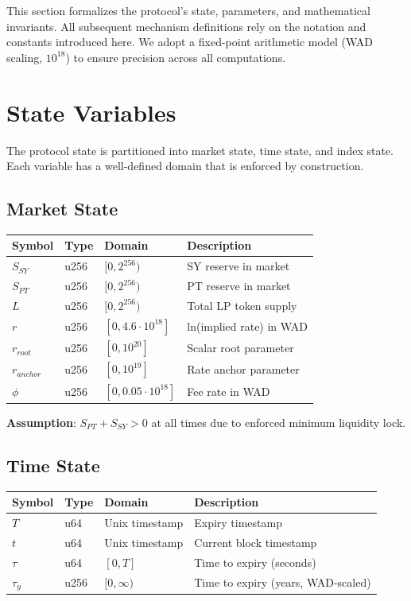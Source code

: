 
This section formalizes the protocol's state, parameters, and mathematical invariants. All subsequent mechanism definitions rely on the notation and constants introduced here. We adopt a fixed-point arithmetic model (WAD scaling, $10^{18}$) to ensure precision across all computations.

\section{State Variables}

The protocol state is partitioned into market state, time state, and index state. Each variable has a well-defined domain that is enforced by construction.

\subsection{Market State}

\begin{center}
\begin{tabular}{llll}
\toprule
\textbf{Symbol} & \textbf{Type} & \textbf{Domain} & \textbf{Description} \\
\midrule
$S_{SY}$ & u256 & $[0, 2^{256})$ & SY reserve in market \\
$S_{PT}$ & u256 & $[0, 2^{256})$ & PT reserve in market \\
$L$ & u256 & $[0, 2^{256})$ & Total LP token supply \\
$r$ & u256 & $[0, 4.6 \cdot 10^{18}]$ & ln(implied rate) in WAD \\
$r_{root}$ & u256 & $[0, 10^{20}]$ & Scalar root parameter \\
$r_{anchor}$ & u256 & $[0, 10^{19}]$ & Rate anchor parameter \\
$\phi$ & u256 & $[0, 0.05 \cdot 10^{18}]$ & Fee rate in WAD \\
\bottomrule
\end{tabular}
\end{center}

\textbf{Assumption}: $S_{PT} + S_{SY} > 0$ at all times due to enforced minimum liquidity lock.

\subsection{Time State}

\begin{center}
\begin{tabular}{llll}
\toprule
\textbf{Symbol} & \textbf{Type} & \textbf{Domain} & \textbf{Description} \\
\midrule
$T$ & u64 & Unix timestamp & Expiry timestamp \\
$t$ & u64 & Unix timestamp & Current block timestamp \\
$\tau$ & u64 & $[0, T]$ & Time to expiry (seconds) \\
$\tau_y$ & u256 & $[0, \infty)$ & Time to expiry (years, WAD-scaled) \\
\bottomrule
\end{tabular}
\end{center}

